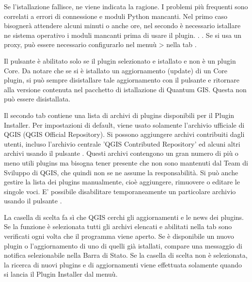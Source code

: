 Se l'istallazione fallisce, ne viene indicata la ragione. I problemi più frequenti sono correlati a errori di connessione e moduli Python mancanti. Nel primo caso bisognerà attendere alcuni minuti o anche ore, nel secondo è necessario istallare ne sistema operativo i moduli mancanti  prima di usare il plugin. . . Se si usa un proxy, può essere necessario configurarlo nel menuù  >  nella tab .

Il pulsante  è abilitato solo se il plugin selezionato e istallato e non è un plugin Core. Da notare che se si è istallato un aggiornamento (update) di un Core plugin, si può sempre disistallare tale aggiornamento con il pulsante  e ritornare alla versione contenuta nel pacchetto di istallazione di Quantum GIS. Questa non può essere disistallata.


Il secondo tab  contiene una lista di archivi di plugins disponibili per il Plugin Installer. Per impostazioni di default, viene usato solamente l'archivio ufficiale di QGIS (QGIS Official Repository). Si possono aggiungere archivi contribuiti dagli utenti, incluso l'archivio centrale 'QGIS Contributed Repository' ed alcuni altri archivi usando il pulsante  . Questi archivi contengono un gran numero di più o meno utili plugins ma bisogna tener presente che non sono mantenuti dal Team di Sviluppo di QGIS, che quindi non se ne assume la responsabilità.
Si può anche gestire la lista dei plugins manualmente, cioè aggiungere, rimuovere o editare le singole voci. E' possibile disabilitare temporaneamente un particolare archivio usando il pulsante .

La casella di scelta  fa sì che QGIS cerchi gli aggiornamenti e le news dei plugins. Se la funzione è selezionata tutti gli archivi elencati e abilitati nella tab  sono verificati ogni volta che il programma viene aperto. Se è disponibile un nuovo plugin o l'aggiornamento di uno di quelli già istallati, compare una messaggio di notifica selezionabile nella Barra di Stato. Se la casella di scelta non è selezionata, la ricerca di nuovi plugins e di aggiornamenti viene effettuata solamente quando si lancia il Plugin Installer dal menuù.

